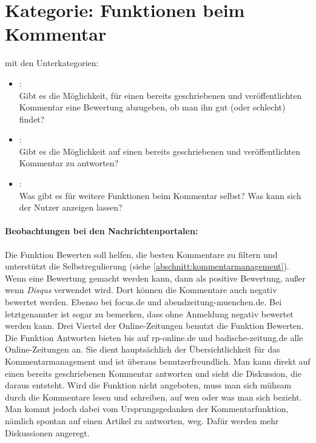 \section{Kategorie: \glqq Funktionen beim Kommentar\grqq}

mit den Unterkategorien:
\begin{itemize}
\item{}\grqq:\\
Gibt es die Möglichkeit, für einen bereits geschriebenen und veröffentlichten Kommentar eine Bewertung abzugeben, ob man ihn gut (oder schlecht) findet?

\item{}\grqq: \\
Gibt es die Möglichkeit auf einen bereits geschriebenen und veröffentlichten Kommentar zu antworten?


\item{}\grqq:\\
Was gibt es für weitere Funktionen beim Kommentar selbst? Was kann sich der Nutzer anzeigen lassen? 


\end{itemize}

\paragraph{Beobachtungen bei den Nachrichtenportalen:}

Die Funktion \glqq Bewerten\grqq \- soll helfen, die besten Kommentare zu
filtern und unterstützt die Selbstregulierung (siehe
\ref{abschnitt:kommentarmanagement}).  Wenn eine Bewertung gemacht werden kann,
dann als positive Bewertung, außer wenn  {\slshape Disqus} verwendet wird. Dort
können die Kommentare auch negativ bewertet werden. Ebenso bei focus.de und abendzeitung-muenchen.de. 
Bei letztgenannter ist sogar zu bemerken, dass ohne Anmeldung negativ bewertet werden kann. 
 Drei Viertel der Online-Zeitungen benutzt die Funktion \glqq Bewerten\grqq. \\ Die
Funktion \glqq Antworten\grqq{} bieten bis auf rp-online.de und
badische-zeitung.de alle Online-Zeitungen an.  Sie dient hauptsächlich der
Übersichtlichkeit für das Kommentarmanagement und ist überaus
benutzerfreundlich. Man kann direkt auf einen bereits geschriebenen Kommentar
antworten und sieht die Diskussion, die daraus entsteht.  Wird die Funktion
nicht angeboten, muss man sich mühsam durch die Kommentare lesen und schreiben,
auf wen oder was man sich bezieht.  Man kommt jedoch dabei vom Ursprungsgedanken
der Kommentarfunktion, nämlich spontan auf einen Artikel zu antworten, weg.
Dafür werden mehr Diskussionen angeregt.

